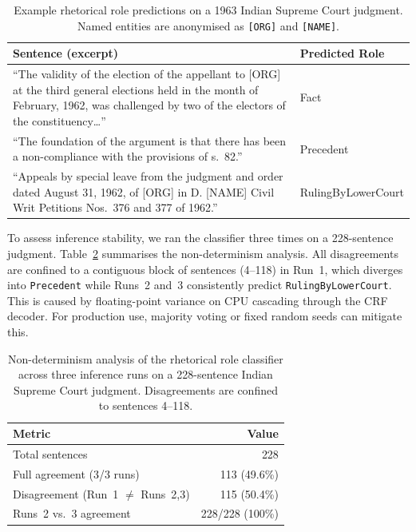 \documentclass[11pt]{article}
\begin{document}
\begin{table}[htbp]
\centering
\footnotesize
\setlength{\tabcolsep}{4pt}
\begin{tabular}{@{}p{}l@{}}
\toprule
\textbf{Sentence (excerpt)} & \textbf{Predicted Role} \\
\midrule
``The validity of the election of the appellant to [ORG] at the third general elections held in the month of February, 1962, was challenged by two of the electors of the constituency\ldots'' & Fact \\
\midrule
``The foundation of the argument is that there has been a non-compliance with the provisions of s.~82.'' & Precedent \\
\midrule
``Appeals by special leave from the judgment and order dated August 31, 1962, of [ORG] in D. [NAME] Civil Writ Petitions Nos.~376 and 377 of 1962.'' & RulingByLowerCourt \\
\bottomrule
\end{tabular}
\caption{Example rhetorical role predictions on a 1963 Indian Supreme Court judgment. Named entities are anonymised as \texttt{[ORG]} and \texttt{[NAME]}.}
\label{tab:rr_example}
\end{table}

To assess inference stability, we ran the classifier three times on a 228-sentence judgment.
Table~\ref{tab:rr_ndet} summarises the non-determinism analysis.
All disagreements are confined to a contiguous block of sentences (4--118) in Run~1, which diverges into \texttt{Precedent} while Runs~2 and~3 consistently predict \texttt{RulingByLowerCourt}.
This is caused by floating-point variance on CPU cascading through the CRF decoder.
For production use, majority voting or fixed random seeds can mitigate this.

\begin{table}[htbp]
\centering
\small
\begin{tabular}{@{}lr@{}}
\toprule
\textbf{Metric} & \textbf{Value} \\
\midrule
Total sentences          & 228 \\
Full agreement (3/3 runs) & 113 (49.6\%) \\
Disagreement (Run~1 $\neq$ Runs~2,3) & 115 (50.4\%) \\
Runs~2 vs.~3 agreement   & 228/228 (100\%) \\
\bottomrule
\end{tabular}
\caption{Non-determinism analysis of the rhetorical role classifier across three inference runs on a 228-sentence Indian Supreme Court judgment. Disagreements are confined to sentences 4--118.}
\label{tab:rr_ndet}
\end{table}
\end{document}
